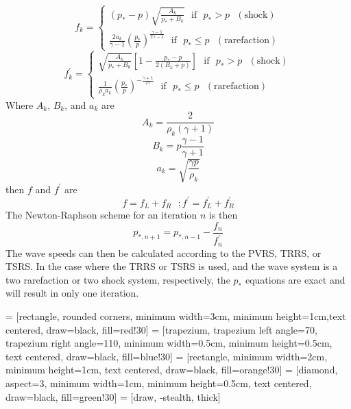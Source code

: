 \begin{equation}
	f_k = \begin{cases}
		\left(p_* - p\right) \sqrt{\frac{A_k}{p_* + B_k}} \,\,\,\, \textrm{if} \,\,\,\, p_* > p \,\,\,\, \left(\textrm{shock}\right)\\
		\frac{2 a_k}{\gamma - 1} \left(\frac{p_*}{p}\right)^{\frac{\gamma - 1}{2 \gamma - 1}}\,\,\,\, \textrm{if} \,\,\,\, p_* \le p \,\,\,\, \left(\textrm{rarefaction}\right)
	\end{cases}
\end{equation}
\begin{equation}
	f^{\prime}_k = \begin{cases}
		\sqrt{\frac{A_k}{p_* + B_k}} \left[1 - \frac{p_* - p}{ 2 \left(B_k + p\right)}\right]  \,\,\,\, \textrm{if} \,\,\,\, p_* > p \,\,\,\, \left(\textrm{shock}\right)\\
		\frac{1}{\rho_k a_k} \left(\frac{p_*}{p}\right)^{-\frac{\gamma + 1}{2 \gamma}} \,\,\,\, \textrm{if} \,\,\,\, p_* \le p \,\,\,\, \left(\textrm{rarefaction}\right)
	\end{cases}
\end{equation}
Where $A_k$, $B_k$, and $a_k$ are
\begin{equation}
	A_k = \frac{2}{\rho_k \left(\gamma + 1\right)}
\end{equation}
\begin{equation}
	B_k = p \frac{\gamma - 1}{\gamma + 1}
\end{equation}
\begin{equation}
	a_k = \sqrt{\frac{\gamma p}{\rho_k}}
\end{equation}
then $f$ and $f^{\prime}$ are
\begin{equation}
	f = f_L + f_R \,\,\,\, ; f^{\prime} = f^{\prime}_L + f^{\prime}_R
\end{equation}
The Newton-Raphson scheme for an iteration $n$ is then
\begin{equation}
	p_{*,n+1} = p_{*,n-1} - \frac{f_n}{f^{\prime}_n}
\end{equation}
The wave speeds can then be calculated according to the PVRS, TRRS, or TSRS. In the case where the TRRS or TSRS is used, and the wave system is a two rarefaction or two shock system, respectively, the $p_*$ equations are exact and will result in only one iteration.

 = [rectangle, rounded corners, minimum width=3cm, minimum height=1cm,text centered, draw=black, fill=red!30]
 = [trapezium, trapezium left angle=70, trapezium right angle=110, minimum width=0.5cm, minimum height=0.5cm, text centered, draw=black, fill=blue!30]
 = [rectangle, minimum width=2cm, minimum height=1cm, text centered, draw=black, fill=orange!30]
 = [diamond, aspect=3, minimum width=1cm, minimum height=0.5cm, text centered, draw=black, fill=green!30]
 = [draw, -stealth, thick]


